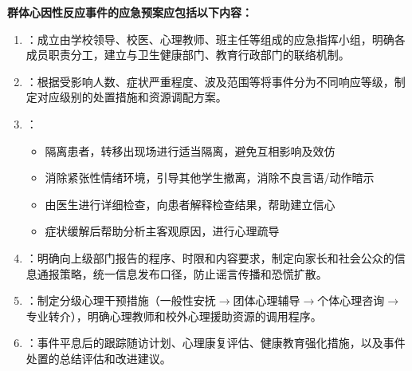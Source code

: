 \begin{keybox}
\textbf{群体心因性反应事件的应急预案应包括以下内容：}

\begin{enumerate}[leftmargin=*]
    \item {}：成立由学校领导、校医、心理教师、班主任等组成的应急指挥小组，明确各成员职责分工，建立与卫生健康部门、教育行政部门的联络机制。

    \item {}：根据受影响人数、症状严重程度、波及范围等将事件分为不同响应等级，制定对应级别的处置措施和资源调配方案。

    \item {}：
    \begin{itemize}
        \item 隔离患者，转移出现场进行适当隔离，避免互相影响及效仿
        \item 消除紧张性情绪环境，引导其他学生撤离，消除不良言语/动作暗示
        \item 由医生进行详细检查，向患者解释检查结果，帮助建立信心
        \item 症状缓解后帮助分析主客观原因，进行心理疏导
    \end{itemize}

    \item {}：明确向上级部门报告的程序、时限和内容要求，制定向家长和社会公众的信息通报策略，统一信息发布口径，防止谣言传播和恐慌扩散。

    \item {}：制定分级心理干预措施（一般性安抚$\rightarrow$团体心理辅导$\rightarrow$个体心理咨询$\rightarrow$专业转介），明确心理教师和校外心理援助资源的调用程序。

    \item {}：事件平息后的跟踪随访计划、心理康复评估、健康教育强化措施，以及事件处置的总结评估和改进建议。
\end{enumerate}
\end{keybox}

